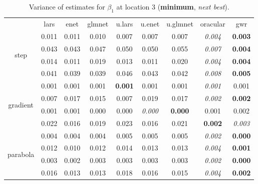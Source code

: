 \documentclass[authoryear, review, 11pt]{elsarticle}
\begin{document}
\begin{table}[ht]
\begin{center}
\begin{tabular}{ccccccccc}
  & lars & enet & glmnet & u.lars & u.enet & u.glmnet & oracular & gwr \\ 
  \cline{2-9}
  \multirow{4}{*}{step} & 0.011 & 0.011 & 0.010 & 0.007 & 0.007 & 0.007 & \emph{0.004} & \textbf{0.003} \\ 
  & 0.043 & 0.043 & 0.047 & 0.050 & 0.050 & 0.055 & \emph{0.007} & \textbf{0.004} \\ 
  & 0.014 & 0.011 & 0.019 & 0.013 & 0.011 & 0.020 & \emph{0.004} & \textbf{0.004} \\ 
  & 0.041 & 0.039 & 0.039 & 0.046 & 0.043 & 0.042 & \emph{0.008} & \textbf{0.005} \\ 
  \cline{2-9}
  \multirow{4}{*}{gradient} & 0.001 & 0.001 & 0.001 & \textbf{0.001} & 0.001 & 0.001 & \emph{0.001} & 0.001 \\ 
  & 0.007 & 0.017 & 0.015 & 0.007 & 0.019 & 0.017 & \emph{0.002} & \textbf{0.002} \\ 
  & 0.001 & 0.001 & 0.000 & 0.000 & \emph{0.000} & \textbf{0.000} & 0.001 & 0.002 \\ 
  & 0.022 & 0.016 & 0.019 & 0.023 & 0.016 & 0.021 & \textbf{0.002} & \emph{0.003} \\ 
  \cline{2-9}
  \multirow{4}{*}{parabola} & 0.004 & 0.004 & 0.004 & 0.005 & 0.005 & 0.005 & \emph{0.002} & \textbf{0.000} \\ 
  & 0.012 & 0.010 & 0.012 & 0.014 & 0.013 & 0.013 & \emph{0.004} & \textbf{0.001} \\ 
  & 0.003 & 0.002 & 0.003 & 0.003 & 0.003 & 0.003 & \emph{0.002} & \textbf{0.000} \\ 
  & 0.016 & 0.013 & 0.013 & 0.018 & 0.016 & 0.015 & \emph{0.004} & \textbf{0.002} \\ 
  \end{tabular}
\caption{Variance of estimates for $\beta_1$ at location 3 (\textbf{minimum}, \emph{next best}).\label{table:loc3-X1-varx}}
\end{center}
\end{table}
\end{document}
